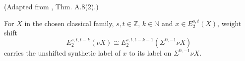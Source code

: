\begin{theorem}
\label{frontier:Literature:6d7a8d6a798c}
(Adapted from \cite{BHS}, Thm. A.8(2).)\par{}

For $X$ in the chosen classical family, $s,t\in\mathbb Z$, $k\in\mathbb N$ and $x\in E_2^{s,t}(X)$, weight shift\[E_2^{s,t,t-k}(\nu X)\cong E_2^{s,t,t-k-1}(\Sigma^{0,-1}\nu X)\]carries the unshifted synthetic label of $x$ to its label on $\Sigma^{0,-1}\nu X$.
\end{theorem}

